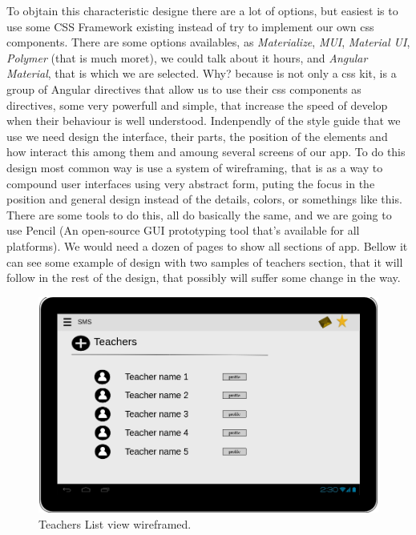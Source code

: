 \noindent To objtain this characteristic designe there are a lot of options, but easiest
is to use some CSS Framework existing instead of try to implement our own
css components. There are some options availables, as \textit{Materialize},
\textit{MUI}, \textit{Material UI}, \textit{Polymer} (that is much moret),
we could talk about it hours, and \textit{Angular Material}, that is which
we are selected.
Why? because is not only a css kit, is a group of Angular directives that allow
us to use their css components as directives, some very powerfull and simple,
that increase the speed of develop when their behaviour is well understood.
\intro
Indenpendly of the style guide that we use we need design the interface,
their parts, the position of the elements and how interact this among them and
amoung several screens of our app.
To do this design most common way is use a system of wireframing, that is
as a way to compound user interfaces using very abstract form, puting the
focus in the position and general design instead of the details, colors, or
somethings like this.
There are some tools to do this, all do basically the same, and we
are going to use Pencil (An open-source GUI prototyping tool that's available
for all platforms).
\intro
We would need a dozen of pages to show all sections of app. Bellow it can see
some example of design with two samples of teachers section,
that it will follow in the rest of the design, that possibly will suffer some
change in the way.

\begin{figure}[H]
  \includegraphics[scale=0.2]{img/snaps/teachers_list_wireframe.png}
  \centering
  \caption{Teachers List view wireframed.}
\end{figure}

